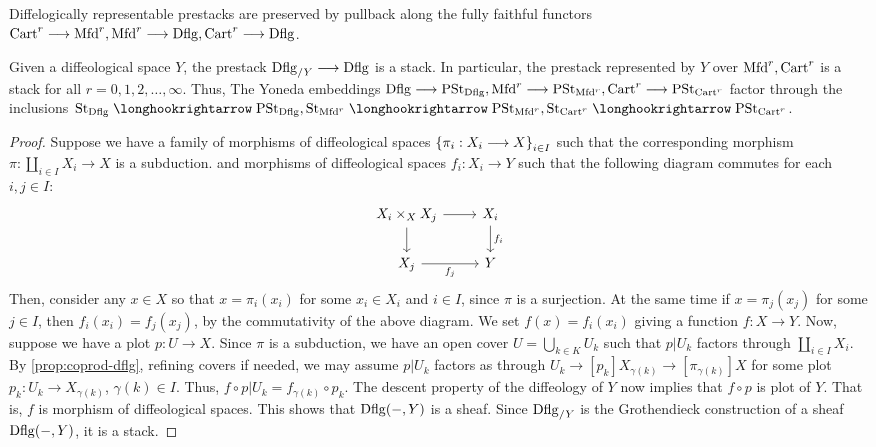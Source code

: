 \documentclass[11pt]{amsart}
\begin{document}
\begin{cor}\label{cor:dflg-rep-prest-pullback}
Diffelogically representable prestacks are preserved by pullback along
the fully faithful functors $\Cart^r \to \Mfd^r, \Mfd^r \to \Dflg, \Cart^r \to \Dflg$.
\end{cor}

\begin{prop}\label{prop:dflg-sp-st}
Given a diffeological space $Y$, the prestack $\Dflg_{/Y} \to \Dflg$ is a stack.
In particular, the prestack represented by $Y$ over $\mathrm{Mfd}^r, \mathrm{Cart}^r$ is a stack for all
$r = 0, 1, 2, \dots, \infty$. Thus,
The Yoneda embeddings $\Dflg \to \PSt_{\Dflg}, \Mfd^r \to \PSt_{\Mfd^r}, \Cart^r \to \PSt_{\Cart^r}$
factor through the inclusions $\St_{\Dflg} \hto \PSt_{\Dflg}, \St_{\Mfd^r} \hto \PSt_{\Mfd^r},
\St_{\Cart^r} \hto \PSt_{\Cart^r}$.
\end{prop}
\begin{proof}
Suppose we have a family of morphisms of diffeological spaces $\set{\pi_i : X_i \to X}_{i \in I}$
such that the corresponding morphism $\pi : \coprod_{i \in I} X_i \to X$ is a subduction.
and morphisms of diffeological spaces $f_i : X_i \to Y$ such that the following diagram commutes
for each $i, j \in I$:
\[\begin{tikzcd}
X_i \times_X X_j \ar[r] \ar[d] & X_i \ar[d, "f_i"] \\
X_j \ar[r, "f_j" below] & Y
\end{tikzcd}\]
Then, consider any $x \in X$ so that $x = \pi_i(x_i)$ for some $x_i \in X_i$ and $i \in I$,
since $\pi$ is a surjection. At the same time if $x = \pi_j(x_j)$ for some $j \in I$,
then $f_i(x_i) = f_j(x_j)$, by the commutativity of the above diagram.
We set $f(x) = f_i(x_i)$ giving a function $f : X \to Y$. Now, suppose we have a plot
$p : U \to X$. Since $\pi$ is a subduction, we have an open cover $U = \bigcup_{k \in K} U_k$
such that $p|U_k$ factors through $\coprod_{i \in I} X_i$. By \cref{prop:coprod-dflg},
refining covers if needed, we may assume $p|U_k$ factors as through
$U_k \to[p_k] X_{\gamma(k)} \to[\pi_{\gamma(k)}] X$ for some plot
$p_k : U_k \to X_{\gamma(k)}$, $\gamma(k) \in I$.
Thus, $f \circ p|U_k = f_{\gamma(k)} \circ p_k$. The descent property of the diffeology
of $Y$ now implies that $f \circ p$ is plot of $Y$. That is, $f$ is morphism of diffeological
spaces. This shows that $\mathrm{Dflg}(-, Y)$ is a sheaf. Since $\mathrm{Dflg}_{/Y}$ is the Grothendieck
construction of a sheaf $\mathrm{Dflg}(-, Y)$, it is a stack.
\end{proof}
\end{document}
